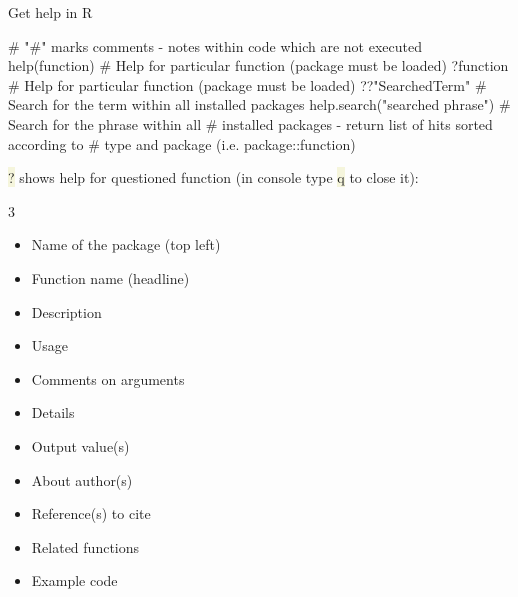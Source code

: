 \documentclass[compress, xelatex, 11pt, xcolor=svgnames, aspectratio=169, url={hyphens, lowtilde}]{beamer}
\renewcommand{\texttt}[1]{\colorbox{Beige}{{\ttfamily #1}}}
\begin{document}
\begin{frame}[fragile]{Get help in R}
	\begin{spluscode}
    # "#" marks comments - notes within code which are not executed
    help(function) # Help for particular function (package must be loaded)
    ?function # Help for particular function (package must be loaded)
    ??"SearchedTerm" # Search for the term within all installed packages
    help.search("searched phrase") # Search for the phrase within all
      # installed packages - return list of hits sorted according to
      # type and package (i.e. package::function)
	\end{spluscode}
	\vfill
	\alert{\texttt{?}} shows help for questioned function (in console type \texttt{q} to close it):
	\vfill
	\begin{multicols}{3}
		\begin{itemize}
			\item Name of the package (top left)
			\item Function name (headline)
			\item Description
			\item Usage
			\item Comments on arguments
			\item Details
			\item Output value(s)
			\item About author(s)
			\item Reference(s) to cite
			\item Related functions
			\item Example code
		\end{itemize}
	\end{multicols}
	\vfill
\end{frame}
\end{document}
